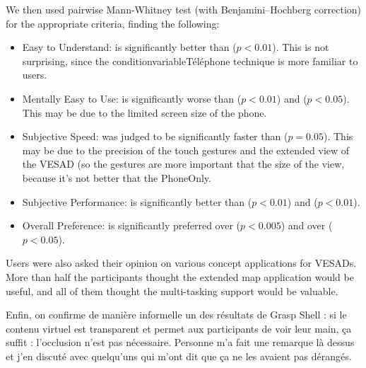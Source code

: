 We then used pairwise Mann-Whitney test (with Benjamini–Hochberg correction) for the appropriate criteria, finding the following:
\begin{itemize}
 \item Easy to Understand:  is significantly better than  ($p<0.01$). This is not surprising, since the conditionvariable{Téléphone} technique is more familiar to users.
 \item Mentally Easy to Use:  is significantly worse than  ($p<0.01$) and  ($p<0.05$). This may be due to the limited screen size of the phone.
 \item Subjective Speed:  was judged to be significantly faster than  ($p=0.05$). This may be due to the precision of the touch gestures and the extended view of the VESAD (so the gestures are more important that the size of the view, because it's not better that the PhoneOnly.
 \item Subjective Performance:  is significantly better than  ($p<0.01$) and  ($p<0.01$).
 \item Overall Preference:  is significantly preferred over  ($p<0.005$) and over  ($p<0.05$). 
\end{itemize}




Users were also asked their opinion on various concept applications for VESADs. More than half the participants thought the extended map application  would be useful, and all of them thought the multi-tasking support  would be valuable.

Enfin, on confirme de manière informelle un des résultats de Grasp Shell : si le contenu virtuel est transparent et permet aux participants de voir leur main, ça suffit : l'occlusion n'est pas nécessaire. Personne m'a fait une remarque là dessus et j'en discuté avec quelqu'uns qui m'ont dit que ça ne les avaient pas dérangés.